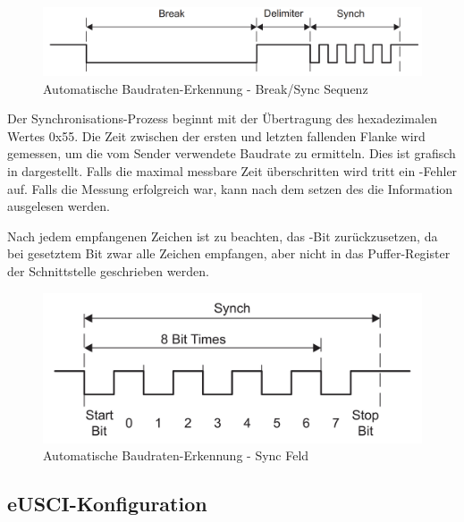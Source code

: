 \begin{figure}[h!]
	\centering
	\includegraphics[width=1.0\textwidth]{../Bilder/auto_baud.png}
	\caption{Automatische Baudraten-Erkennung - Break/Sync Sequenz\\}
	\label{fig:auto_baud}
\end{figure}

Der Synchronisations-Prozess beginnt mit der \"Ubertragung des hexadezimalen Wertes 0x55. Die Zeit zwischen der ersten und letzten fallenden Flanke wird gemessen, um die vom Sender verwendete Baudrate zu ermitteln. Dies ist grafisch in  dargestellt. Falls die maximal messbare Zeit \"uberschritten wird tritt ein -Fehler auf. Falls die Messung erfolgreich war, kann nach dem setzen des  die Information ausgelesen werden. 

Nach jedem empfangenen Zeichen ist zu beachten, das -Bit zur\"uckzusetzen, da bei gesetztem Bit zwar alle Zeichen empfangen, aber nicht in das Puffer-Register der Schnittstelle geschrieben werden. 

\begin{figure}[h!]
	\centering
	\includegraphics[width=1.0\textwidth]{../Bilder/sync_field.png}
	\caption{Automatische Baudraten-Erkennung - Sync Feld\\}
	\label{fig:sync_field}
\end{figure}

\newpage
\subsection{eUSCI-Konfiguration}
\label{eUSCI_Konfiguration}

